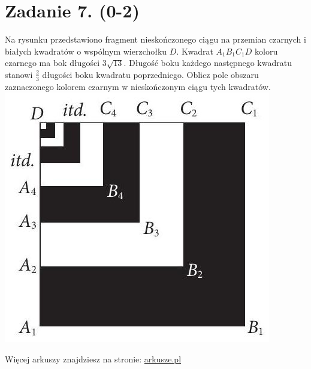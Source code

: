 \documentclass[10pt]{article}
\begin{document}
\section*{Zadanie 7. (0-2)}
Na rysunku przedstawiono fragment nieskończonego ciągu na przemian czarnych i białych kwadratów o wspólnym wierzchołku \(D\). Kwadrat \(A_{1} B_{1} C_{1} D\) koloru czarnego ma bok długości \(3 \sqrt{13}\). Długość boku każdego następnego kwadratu stanowi \(\frac{2}{3}\) długości boku kwadratu poprzedniego. Oblicz pole obszaru zaznaczonego kolorem czarnym w nieskończonym ciągu tych kwadratów.\\
\includegraphics[max width=\textwidth, center]{2024_11_21_f29375993e8c629c464fg-05}

Więcej arkuszy znajdziesz na stronie: \href{http://arkusze.pl}{arkusze.pl}
\end{document}
